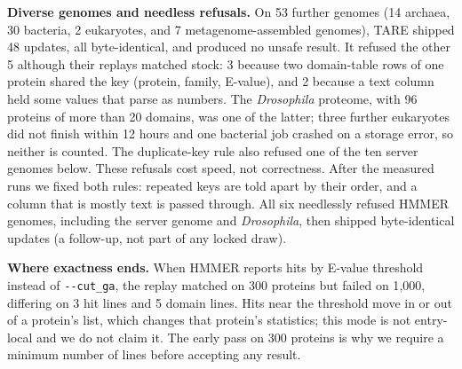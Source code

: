 \documentclass[letterpaper,twocolumn,10pt]{article}
\theoremstyle{definition}
\newcommand{\sys}{TARE\xspace}
\newcommand{\sys}{PARE\xspace}
\newcommand{\cutga}{\texttt{-{}-cut\_ga}\xspace}
\begin{document}
\textbf{Diverse genomes and needless refusals.} On 53 further genomes (14 archaea, 30 bacteria, 2 eukaryotes, and 7
metagenome\nobreakdash-assembled genomes), \sys shipped 48 updates, all byte\nobreakdash-identical, and produced no unsafe result. It
refused the other 5 although their replays matched stock: 3 because two domain\nobreakdash-table rows of one protein shared the key
(protein, family, E-value), and 2 because a text column held some values that parse as numbers. The \textit{Drosophila}
proteome, with 96 proteins of more than 20 domains, was one of the latter; three further eukaryotes did not finish within
12 hours and one bacterial job crashed on a storage error, so neither is counted. The duplicate\nobreakdash-key rule also refused
one of the ten server genomes below. These refusals cost speed, not correctness. After the measured runs we fixed both
rules: repeated keys are told apart by their order, and a column that is mostly text is passed through. All six
needlessly refused HMMER genomes, including the server genome and \textit{Drosophila}, then shipped byte\nobreakdash-identical
updates (a follow\nobreakdash-up, not part of any locked draw).

\textbf{Where exactness ends.} When HMMER reports hits by E-value threshold instead of \cutga, the replay matched on 300
proteins but failed on 1{,}000, differing on 3 hit lines and 5 domain lines. Hits near the threshold move in or out of a
protein's list, which changes that protein's statistics; this mode is not entry\nobreakdash-local and we do not claim it. The early
pass on 300 proteins is why we require a minimum number of lines before accepting any result.
\end{document}
